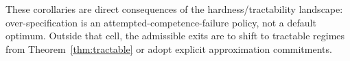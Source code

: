 These corollaries are direct consequences of the hardness/tractability landscape: over-specification is an attempted-competence-failure policy, not a default optimum. Outside that cell, the admissible exits are to shift to tractable regimes from Theorem~\ref{thm:tractable} or adopt explicit approximation commitments.
